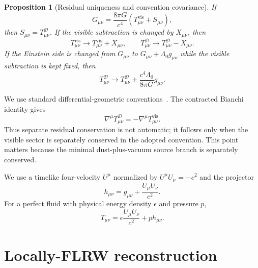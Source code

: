 \documentclass[
  aps,
  prd,
  reprint,
  superscriptaddress,
  floatfix,
  nofootinbib,
  longbibliography
]{revtex4-2}
\theoremstyle{plain}
\newtheorem{proposition}[theorem]{Proposition}
\theoremstyle{definition}
\theoremstyle{remark}
\newcommand{\D}{\mathcal D}
\newcommand{\vis}{\mathrm{vis}}
\newcommand{\eps}{\epsilon}
\begin{document}
\begin{proposition}[Residual uniqueness and convention covariance]
If
\begin{equation}
G_{\mu\nu}=\frac{8\pi G}{c^4}\left(T^{\vis}_{\mu\nu}+S_{\mu\nu}\right),
\end{equation}
then \(S_{\mu\nu}=T^\D_{\mu\nu}\).  If the visible subtraction is changed by
\(X_{\mu\nu}\), then
\begin{equation}
T^{\vis}_{\mu\nu}\to T^{\vis}_{\mu\nu}+X_{\mu\nu},
\qquad
T^\D_{\mu\nu}\to T^\D_{\mu\nu}-X_{\mu\nu} .
\end{equation}
If the Einstein side is changed from \(G_{\mu\nu}\) to
\(G_{\mu\nu}+\Lambda_0g_{\mu\nu}\) while the visible subtraction is kept fixed,
then
\begin{equation}
T^\D_{\mu\nu}\to T^\D_{\mu\nu}+\frac{c^4\Lambda_0}{8\pi G}g_{\mu\nu} .
\end{equation}
\end{proposition}

We use standard differential-geometric conventions~\cite{Wald}.  The contracted Bianchi identity gives
\begin{equation}
\nabla^\mu T^\D_{\mu\nu}=-\nabla^\mu T^{\vis}_{\mu\nu} .
\label{eq:bianchi_residual_v5}
\end{equation}
Thus separate residual conservation is not automatic; it follows only when the
visible sector is separately conserved in the adopted convention.  This point
matters because the minimal dust-plus-vacuum source branch is separately
conserved.

We use a timelike four-velocity \(U^\mu\) normalized by
\(U^\mu U_\mu=-c^2\) and the projector
\begin{equation}
h_{\mu\nu}=g_{\mu\nu}+\frac{U_\mu U_\nu}{c^2} .
\label{eq:projector_v5}
\end{equation}
For a perfect fluid with physical energy density \(\eps\) and pressure \(p\),
\begin{equation}
T_{\mu\nu}=\eps\frac{U_\mu U_\nu}{c^2}+p h_{\mu\nu} .
\label{eq:perfect_fluid_v5}
\end{equation}

\section{Locally-FLRW reconstruction}
\end{document}
